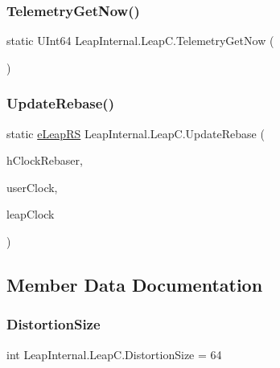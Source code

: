 \mbox{\label{class_leap_internal_1_1_leap_c_a415ed5d4673719ca1d3ed8c133416693}} 
\subsubsection{\texorpdfstring{TelemetryGetNow()}{TelemetryGetNow()}}
{\footnotesize\ttfamily static U\+Int64 Leap\+Internal.\+Leap\+C.\+Telemetry\+Get\+Now (\begin{DoxyParamCaption}{ }\end{DoxyParamCaption})}

\mbox{\label{class_leap_internal_1_1_leap_c_a27dbedabde4b0e1b86cea09687ba3f49}} 
\subsubsection{\texorpdfstring{UpdateRebase()}{UpdateRebase()}}
{\footnotesize\ttfamily static \mbox{\hyperlink{namespace_leap_internal_ae50b07d24c508b84273392b6dcbea1d9}{e\+Leap\+RS}} Leap\+Internal.\+Leap\+C.\+Update\+Rebase (\begin{DoxyParamCaption}\item[{Int\+Ptr}]{h\+Clock\+Rebaser,  }\item[{Int64}]{user\+Clock,  }\item[{Int64}]{leap\+Clock }\end{DoxyParamCaption})}



\subsection{Member Data Documentation}
\mbox{\label{class_leap_internal_1_1_leap_c_a7ac94774e89ba537bf4d7a539315bd2a}} 
\subsubsection{\texorpdfstring{DistortionSize}{DistortionSize}}
{\footnotesize\ttfamily int Leap\+Internal.\+Leap\+C.\+Distortion\+Size = 64\hspace{0.3cm}{\ttfamily [static]}}



